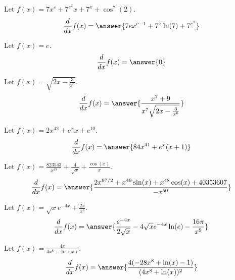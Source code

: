 \documentclass{ximera}
\begin{document}
\begin{shuffle}
\begin{exercise}
Let $f(x)=7 x^e+7^{e^2} x+7^x+\cos ^7(2)$.
\[
\ddx f(x) = \answer{7 e x^{e-1}+7^x \ln (7)+7^{e^2}}
\]
\end{exercise}



\begin{exercise}
\begin{exercise}
Let $f(x)=e$.
\[
\ddx f(x) = \answer{0}
\]
\end{exercise}

\begin{exercise}
Let $f(x)=\sqrt{2 x-\frac{3}{x^6}}$.
\[
\ddx f(x) = \answer{\frac{x^7+9}{x^7 \sqrt{2 x-\frac{3}{x^6}}}}
\]
\end{exercise}

\begin{exercise}
Let $f(x)=2 x^{42}+e^x x+e^{10}$.
\[
\ddx f(x) = \answer{84 x^{41}+e^x (x+1)}
\]
\end{exercise}

\begin{exercise}
Let $f(x)=\frac{823543}{x^{49}}+\frac{4}{\sqrt{x}}+\frac{\cos (x)}{x}$.
\[
\ddx f(x) = \answer{\frac{2 x^{97/2}+x^{49} \sin (x)+x^{48} \cos (x)+40353607}{-x^{50}}}
\]
\end{exercise}

\begin{exercise}
Let $f(x)=\sqrt{x} e^{-4 x}+\frac{2 \pi }{x^8}$.
\[
\ddx f(x) = \answer{\frac{e^{-4 x}}{2 \sqrt{x}}-4 \sqrt{x} e^{-4 x} \ln (e)-\frac{16 \pi }{x^9}}
\]
\end{exercise}

\begin{exercise}
Let $f(x)=\frac{4 x}{4 x^8+\ln (x)}$.
\[
\ddx f(x) = \answer{\frac{4 (-28 x^8+\ln (x)-1)}{(4 x^8+\ln (x))^2}}
\]
\end{exercise}


\end{exercise}
\end{shuffle}
\end{document}
